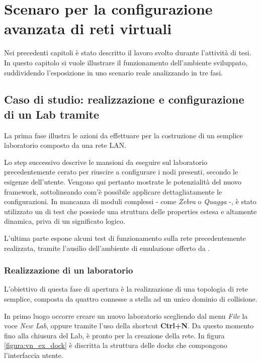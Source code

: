 \chapter{Scenaro per la configurazione avanzata di reti virtuali}\label{capitolo:esempi}

Nei precedenti capitoli è stato descritto il lavoro svolto durante l'attività di tesi. In questo capitolo si vuole illustrare il funzionamento dell'ambiente sviluppato, suddividendo l'esposizione in uno scenario reale analizzando in tre fasi.

\section{Caso di studio: realizzazione e configurazione di un Lab tramite \visualnetkit{}}
La prima fase illustra le azioni da effettuare per la costruzione di un semplice laboratorio composto da una rete LAN.

Lo step successivo descrive le mansioni da eseguire sul laboratorio precedentemente cerato per riuscire a configurare i nodi presenti, secondo le esigenze dell'utente. Vengono qui pertanto mostrate le potenzialità del nuovo \plugin{} framework, sottolineando com'è possibile applicare dettagliatamente le configurazioni. In mancanza di moduli complessi - come \emph{Zebra} o \emph{Quagga} -, è stato utilizzato un \plugin{} di test che possiede una struttura delle properties estesa e altamente dinamica, priva di un significato logico.

L'ultima parte espone alcuni test di funzionamento sulla rete precedentemente realizzata, tramite l'ausilio dell'ambiente di emulazione offerto da \netkit{}.

\subsection{Realizzazione di un laboratorio}
L'obiettivo di questa fase di apertura è la realizzazione di una topologia di rete semplice, composta da quattro \virtualmachine{} connesse a stella ad un unico dominio di collisione.

In primo luogo occorre creare un nuovo laboratorio scegliendo dal menu \emph{File} la voce \emph{New Lab}, oppure tramite l'uso della shortcut \textbf{Ctrl+N}. Da questo momento fino alla chiusura del Lab, \visualnetkit{} è pronto per la creazione della rete. In figura \ref{figura:vn_ex_dock} è discritta la struttura delle docks che compongono l'interfaccia utente.

